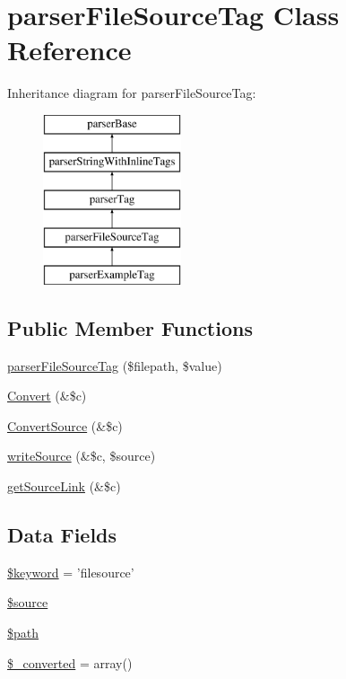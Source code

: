 \hypertarget{classparser_file_source_tag}{\section{parser\-File\-Source\-Tag \-Class \-Reference}
\label{classparser_file_source_tag}
}
\-Inheritance diagram for parser\-File\-Source\-Tag\-:\begin{figure}[H]
\begin{center}
\leavevmode
\includegraphics[height=5.000000cm]{classparser_file_source_tag}
\end{center}
\end{figure}
\subsection*{\-Public \-Member \-Functions}
\begin{DoxyCompactItemize}
\item 
\hyperlink{classparser_file_source_tag_acc4f308b6c496065eda719a91009b9ad}{parser\-File\-Source\-Tag} (\$filepath, \$value)
\item 
\hyperlink{classparser_file_source_tag_ad6c06bea9d11cc1c362b592306cfa707}{\-Convert} (\&\$c)
\item 
\hyperlink{classparser_file_source_tag_ac04d3e20b49fa4ddfce71354ef2044f9}{\-Convert\-Source} (\&\$c)
\item 
\hyperlink{classparser_file_source_tag_aa8282e3797b5543b38d27aebf1ecd9db}{write\-Source} (\&\$c, \$source)
\item 
\hyperlink{classparser_file_source_tag_adabc9556631a05ea803bb7274eca1b95}{get\-Source\-Link} (\&\$c)
\end{DoxyCompactItemize}
\subsection*{\-Data \-Fields}
\begin{DoxyCompactItemize}
\item 
\hyperlink{classparser_file_source_tag_a4a925d6b38bcf3957c713a7d3dc7da1f}{\$keyword} = 'filesource'
\item 
\hyperlink{classparser_file_source_tag_a99a2b085f0a29bd5d799fdcbb63d261b}{\$source}
\item 
\hyperlink{classparser_file_source_tag_a0a4baf0b22973c07685c3981f0d17fc4}{\$path}
\item 
\hyperlink{classparser_file_source_tag_ae0d071b0e97acbebce14aa31446f982e}{\$\-\_\-converted} = array()
\end{DoxyCompactItemize}


